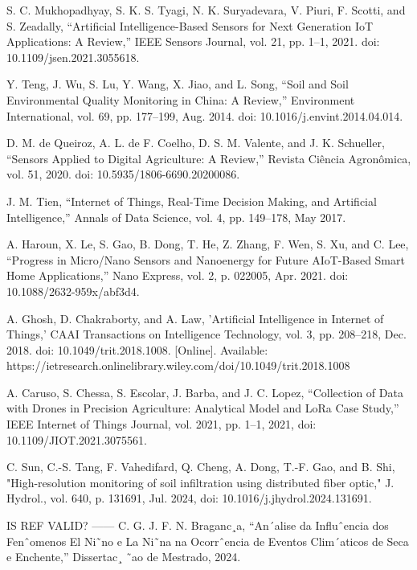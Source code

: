 \documentclass[conference]{IEEEtran}
\begin{document}
\begin{thebibliography}{00}
 S. C. Mukhopadhyay, S. K. S. Tyagi, N. K. Suryadevara, V. Piuri, F. Scotti, and S. Zeadally, 
``Artificial Intelligence-Based Sensors for Next Generation IoT Applications: A Review,'' 
IEEE Sensors Journal, vol. 21, pp. 1--1, 2021. doi: 10.1109/jsen.2021.3055618.

 Y. Teng, J. Wu, S. Lu, Y. Wang, X. Jiao, and L. Song, 
``Soil and Soil Environmental Quality Monitoring in China: A Review,'' 
Environment International, vol. 69, pp. 177--199, Aug. 2014. doi: 10.1016/j.envint.2014.04.014.

 D. M. de Queiroz, A. L. de F. Coelho, D. S. M. Valente, and J. K. Schueller, 
``Sensors Applied to Digital Agriculture: A Review,'' 
Revista Ciência Agronômica, vol. 51, 2020. doi: 10.5935/1806-6690.20200086.

 J. M. Tien, 
``Internet of Things, Real-Time Decision Making, and Artificial Intelligence,'' 
Annals of Data Science, vol. 4, pp. 149--178, May 2017.

 A. Haroun, X. Le, S. Gao, B. Dong, T. He, Z. Zhang, F. Wen, S. Xu, and C. Lee, 
``Progress in Micro/Nano Sensors and Nanoenergy for Future AIoT-Based Smart Home Applications,'' 
Nano Express, vol. 2, p. 022005, Apr. 2021. doi: 10.1088/2632-959x/abf3d4.

 A. Ghosh, D. Chakraborty, and A. Law, 
'Artificial Intelligence in Internet of Things,' 
CAAI Transactions on Intelligence Technology, vol. 3, pp. 208--218, Dec. 2018. doi: 10.1049/trit.2018.1008. [Online]. Available: https://ietresearch.onlinelibrary.wiley.com/doi/10.1049/trit.2018.1008

 A. Caruso, S. Chessa, S. Escolar, J. Barba, and J. C. Lopez, “Collection of Data with Drones in Precision Agriculture: Analytical Model and LoRa Case Study,” IEEE Internet of Things Journal, vol. 2021, pp. 1–1, 2021, doi: 10.1109/JIOT.2021.3075561.

 C. Sun, C.-S. Tang, F. Vahedifard, Q. Cheng, A. Dong, T.-F. Gao, and B. Shi, "High-resolution monitoring of soil infiltration using distributed fiber optic," J. Hydrol., vol. 640, p. 131691, Jul. 2024, doi: 10.1016/j.jhydrol.2024.131691.
 
\end{thebibliography}
 \vspace{12pt}
 \color{red}

IS REF VALID? ------  C. G. J. F. N. Braganc¸a, “An´alise da Influˆencia dos Fenˆomenos El Ni˜no
e La Ni˜na na Ocorrˆencia de Eventos Clim´aticos de Seca e Enchente,”
Dissertac¸ ˜ao de Mestrado, 2024.  
\end{document}
